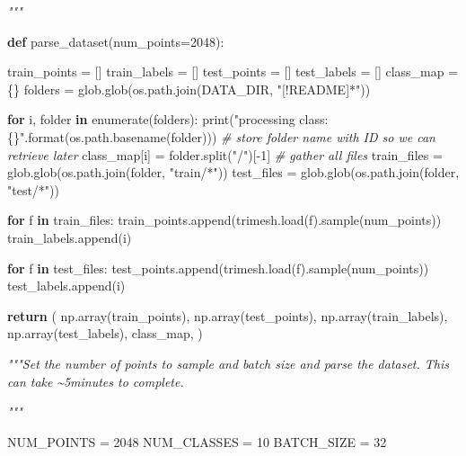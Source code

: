 \documentclass[
  12pt,
  a4paper,
]{article}
\newenvironment{Shaded}{}{}
\newcommand{\BuiltInTok}[1]{#1}
\newcommand{\CommentTok}[1]{\textcolor[rgb]{0.38,0.63,0.69}{\textit{#1}}}
\newcommand{\ControlFlowTok}[1]{\textcolor[rgb]{0.00,0.44,0.13}{\textbf{#1}}}
\newcommand{\DecValTok}[1]{\textcolor[rgb]{0.25,0.63,0.44}{#1}}
\newcommand{\KeywordTok}[1]{\textcolor[rgb]{0.00,0.44,0.13}{\textbf{#1}}}
\newcommand{\NormalTok}[1]{#1}
\newcommand{\OperatorTok}[1]{\textcolor[rgb]{0.40,0.40,0.40}{#1}}
\newcommand{\SpecialCharTok}[1]{\textcolor[rgb]{0.25,0.44,0.63}{#1}}
\newcommand{\StringTok}[1]{\textcolor[rgb]{0.25,0.44,0.63}{#1}}
\begin{document}
\begin{Shaded}
\begin{Highlighting}[]
\CommentTok{"""}

\KeywordTok{def}\NormalTok{ parse\_dataset(num\_points}\OperatorTok{=}\DecValTok{2048}\NormalTok{):}

\NormalTok{    train\_points }\OperatorTok{=}\NormalTok{ []}
\NormalTok{    train\_labels }\OperatorTok{=}\NormalTok{ []}
\NormalTok{    test\_points }\OperatorTok{=}\NormalTok{ []}
\NormalTok{    test\_labels }\OperatorTok{=}\NormalTok{ []}
\NormalTok{    class\_map }\OperatorTok{=}\NormalTok{ \{\}}
\NormalTok{    folders }\OperatorTok{=}\NormalTok{ glob.glob(os.path.join(DATA\_DIR, }\StringTok{"[!README]*"}\NormalTok{))}

    \ControlFlowTok{for}\NormalTok{ i, folder }\KeywordTok{in} \BuiltInTok{enumerate}\NormalTok{(folders):}
        \BuiltInTok{print}\NormalTok{(}\StringTok{"processing class: }\SpecialCharTok{\{\}}\StringTok{"}\NormalTok{.}\BuiltInTok{format}\NormalTok{(os.path.basename(folder)))}
        \CommentTok{\# store folder name with ID so we can retrieve later}
\NormalTok{        class\_map[i] }\OperatorTok{=}\NormalTok{ folder.split(}\StringTok{"/"}\NormalTok{)[}\OperatorTok{{-}}\DecValTok{1}\NormalTok{]}
        \CommentTok{\# gather all files}
\NormalTok{        train\_files }\OperatorTok{=}\NormalTok{ glob.glob(os.path.join(folder, }\StringTok{"train/*"}\NormalTok{))}
\NormalTok{        test\_files }\OperatorTok{=}\NormalTok{ glob.glob(os.path.join(folder, }\StringTok{"test/*"}\NormalTok{))}

        \ControlFlowTok{for}\NormalTok{ f }\KeywordTok{in}\NormalTok{ train\_files:}
\NormalTok{            train\_points.append(trimesh.load(f).sample(num\_points))}
\NormalTok{            train\_labels.append(i)}

        \ControlFlowTok{for}\NormalTok{ f }\KeywordTok{in}\NormalTok{ test\_files:}
\NormalTok{            test\_points.append(trimesh.load(f).sample(num\_points))}
\NormalTok{            test\_labels.append(i)}

    \ControlFlowTok{return}\NormalTok{ (}
\NormalTok{        np.array(train\_points),}
\NormalTok{        np.array(test\_points),}
\NormalTok{        np.array(train\_labels),}
\NormalTok{        np.array(test\_labels),}
\NormalTok{        class\_map,}
\NormalTok{    )}

\CommentTok{"""Set the number of points to sample and batch size and parse the dataset. This can take}
\CommentTok{\textasciitilde{}5minutes to complete.}

\CommentTok{"""}

\NormalTok{NUM\_POINTS }\OperatorTok{=} \DecValTok{2048}
\NormalTok{NUM\_CLASSES }\OperatorTok{=} \DecValTok{10}
\NormalTok{BATCH\_SIZE }\OperatorTok{=} \DecValTok{32}


\end{Highlighting}
\end{Shaded}
\end{document}
